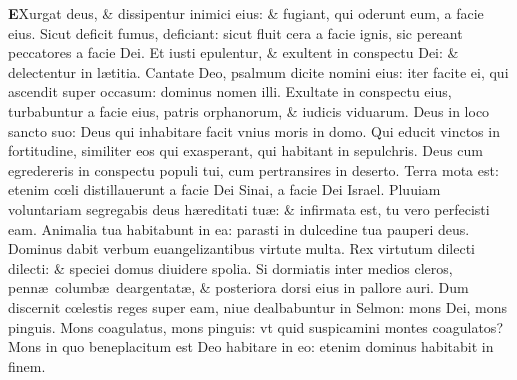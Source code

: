 \documentclass[a5paper,10pt]{book}
\def\ae{æ}
\def\oe{œ}
\begin{document}
\begin{multicols*}{2}
\lettrine[lines=2]{\bfseries \color{red} E}{}Xurgat deus, \& dissipentur inimici eius: \& fugiant, qui oderunt eum, a facie eius.
\newline \color{red} S\color{black}icut deficit fumus, deficiant: sicut fluit cera a facie ignis, sic pereant peccatores a facie Dei.
\newline \color{red} E\color{black}t iusti epulentur, \& exultent in conspectu Dei: \& delectentur in l\ae titia.
\newline \color{red} C\color{black}antate Deo, psalmum dicite nomini eius: iter facite ei, qui ascendit super occasum: dominus nomen illi.
\newline \color{red} E\color{black}xultate in conspectu eius, turbabuntur a facie eius, patris orphanorum, \& iudicis viduarum.
\newline \color{red} D\color{black}eus in loco sancto suo: Deus qui inhabitare facit vnius moris in domo.
\newline \color{red} Q\color{black}ui educit vinctos in fortitudine, similiter eos qui exasperant, qui habitant in sepulchris.
\newline \color{red} D\color{black}eus cum egredereris in conspectu populi tui, cum pertransires in deserto.
\newline \color{red} T\color{black}erra mota est: etenim c\oe li distillauerunt a facie Dei Sinai, a facie Dei Israel.
\newline \color{red} P\color{black}luuiam voluntariam segregabis deus h\ae reditati tu\ae : \& infirmata est, tu vero perfecisti eam.
\newline \color{red} A\color{black}nimalia tua habitabunt in ea: parasti in dulcedine tua pauperi deus.
\newline \color{red} D\color{black}ominus dabit verbum euangelizantibus virtute multa.
\newline \color{red} R\color{black}ex virtutum dilecti dilecti: \& speciei domus diuidere spolia.
\newline \color{red} S\color{black}i dormiatis inter medios cleros, penn\ae \ columb\ae \ deargentat\ae , \& posteriora dorsi eius in pallore auri.
\newline \color{red} D\color{black}um discernit c\oe lestis reges super eam, niue dealbabuntur in Selmon: mons Dei, mons pinguis.
\newline \color{red} M\color{black}ons coagulatus, mons pinguis: vt quid suspicamini montes coagulatos?
\newline \color{red} M\color{black}ons in quo beneplacitum est Deo habitare in eo: etenim dominus habitabit in finem.

\end{multicols*}
\end{document}
